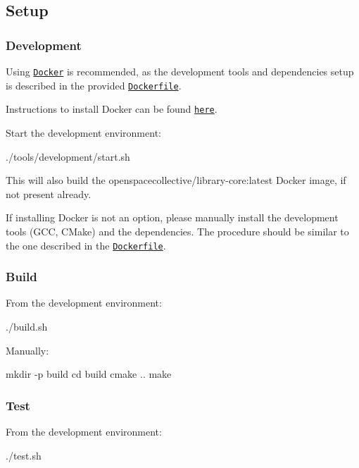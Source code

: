 \subsection*{Setup}

\subsubsection*{Development}

Using \href{https://www.docker.com}{\tt Docker} is recommended, as the development tools and dependencies setup is described in the provided \href{./tools/development/docker/Dockerfile}{\tt Dockerfile}.

Instructions to install Docker can be found \href{https://docs.docker.com/install/}{\tt here}.

Start the development environment\+:


\begin{DoxyCode}
./tools/development/start.sh
\end{DoxyCode}


This will also build the {\ttfamily openspacecollective/library-\/core\+:latest} Docker image, if not present already.

If installing Docker is not an option, please manually install the development tools (G\+CC, C\+Make) and the dependencies. The procedure should be similar to the one described in the \href{./tools/development/docker/Dockerfile}{\tt Dockerfile}.

\subsubsection*{Build}

From the development environment\+:


\begin{DoxyCode}
./build.sh
\end{DoxyCode}


Manually\+:


\begin{DoxyCode}
mkdir -p build
cd build
cmake ..
make
\end{DoxyCode}


\subsubsection*{Test}

From the development environment\+:


\begin{DoxyCode}
./test.sh
\end{DoxyCode}


